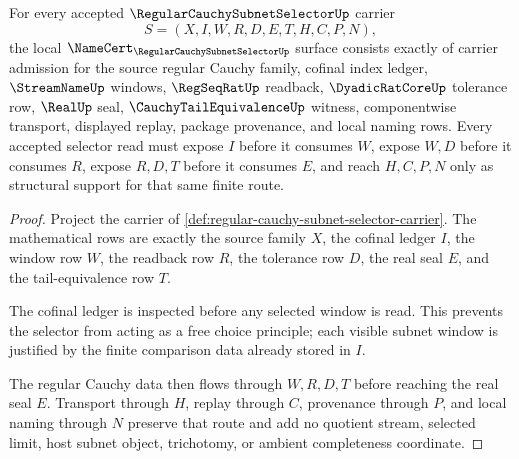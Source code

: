 \begin{theorem}
\label{thm:regular-cauchy-subnet-selector-namecert-obligations}
For every accepted $\RegularCauchySubnetSelectorUp$ carrier
$$
S=(X,I,W,R,D,E,T,H,C,P,N),
$$
the local $\NameCert_{\RegularCauchySubnetSelectorUp}$ surface consists exactly of carrier admission for the source regular Cauchy family, cofinal index ledger, $\StreamNameUp$ windows, $\RegSeqRatUp$ readback, $\DyadicRatCoreUp$ tolerance row, $\RealUp$ seal, $\CauchyTailEquivalenceUp$ witness, componentwise transport, displayed replay, package provenance, and local naming rows. Every accepted selector read must expose $I$ before it consumes $W$, expose $W,D$ before it consumes $R$, expose $R,D,T$ before it consumes $E$, and reach $H,C,P,N$ only as structural support for that same finite route.
\end{theorem}
\begin{proof}
Project the carrier of \autoref{def:regular-cauchy-subnet-selector-carrier}. The mathematical rows are exactly the source family $X$, the cofinal ledger $I$, the window row $W$, the readback row $R$, the tolerance row $D$, the real seal $E$, and the tail-equivalence row $T$.

The cofinal ledger is inspected before any selected window is read. This prevents the selector from acting as a free choice principle; each visible subnet window is justified by the finite comparison data already stored in $I$.

The regular Cauchy data then flows through $W,R,D,T$ before reaching the real seal $E$. Transport through $H$, replay through $C$, provenance through $P$, and local naming through $N$ preserve that route and add no quotient stream, selected limit, host subnet object, trichotomy, or ambient completeness coordinate.
\end{proof}

